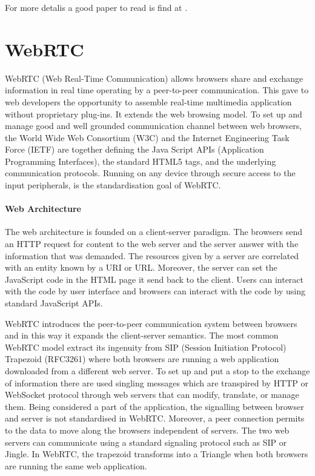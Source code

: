 For more detalis a good paper to read is find at \cite{quigley2009ros}.

\section {WebRTC}
\label{sec:webrtc}
WebRTC (Web Real-Time Communication) \cite{bergkvist2012webrtc} allows browsers share and exchange
information in real time operating by a peer-to-peer communication. This gave to web developers
the opportunity to assemble real-time multimedia application without proprietary plug-ins.
It extends the web browsing model. To set up and manage good and
well grounded communication channel between web browsers,  the World Wide Web Consortium (W3C) and the Internet
Engineering Task Force (IETF) are together defining the Java Script APIs (Application Programming Interfaces), the
standard HTML5 tags, and the underlying communication protocols. Running on any device through secure access to the input
peripherals, is the standardisation goal of WebRTC.

\paragraph{Web Architecture}

The web architecture is founded on a client-server paradigm. The browsers send an HTTP request for content
to the web server and the server answer with the information that was demanded. The resources given by
a server are correlated with an entity known by a URI or URL. Moreover, the server can set the JavaScript
code in the HTML page it send back to the client. Users can interact with the code by user interface and
browsers can interact with the code by using standard JavaScript APIs. 

WebRTC introduces the peer-to-peer communication system between browsers and in this way it expands the
client-server semantics. The most common WebRTC model extract its ingenuity from SIP (Session Initiation Protocol)
Trapezoid (RFC3261) where both  browsers are running a web application downloaded from a different web server.
To set up and put a stop to the exchange of information there are used singling messages which are transpired by
HTTP or WebSocket protocol through web servers that can modify, translate, or manage them. Being considered a part
of the application, the signalling between browser and server is not standardised in WebRTC. Moreover, a peer
connection permits to the data to move along the browsers independent of servers. The two web servers can communicate
using a standard signaling protocol such as SIP or Jingle. In WebRTC, the trapezoid transforms into a Triangle when both
browsers are running the same web application. 

